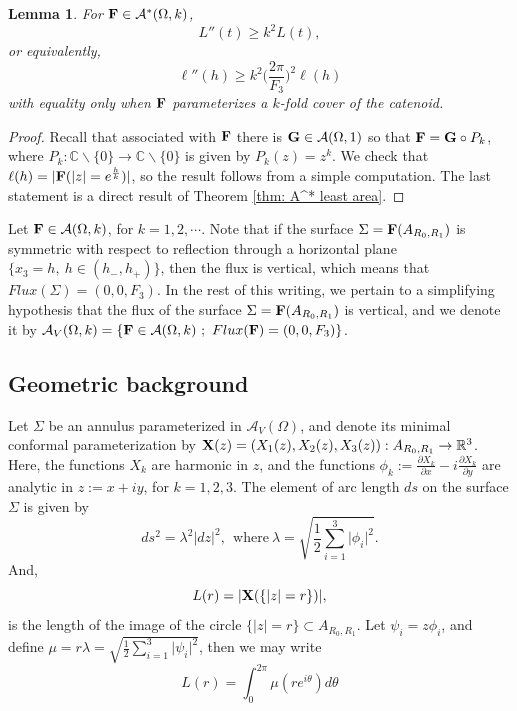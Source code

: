 \documentclass[11pt]{amsart}
\newtheorem{lem}[thm]{Lemma}
\numberwithin{equation}{section}
\theoremstyle{theorem}
\theoremstyle{definition}
\numberwithin{equation}{section}
\begin{document}
\begin{lem} \label{lem: ineq. lenghth for A^*}
    For $\bold{F} \in \mathcal{A}^*(\Omega ,k)$,
    $$
    L''(t)\geq k^2 L(t),
    $$
   or equivalently, 
\begin{equation} 
\nonumber
    \ell ''(h) \geq k^2 \Big ( \frac{2\pi}{F_3} \Big )^2 \ell (h)
\end{equation}
with equality only when $\bold{F}$ parameterizes a $k$-fold cover of the catenoid.
\end{lem}
\begin{proof}
    Recall that associated with $\bold{F}$ there is $\bold{G}\in \mathcal{A}(\Omega,1)$ so that $\bold{F}=\bold{G}\circ P_k$, where $P_k:\mathbb{C}\backslash \{0\} \rightarrow \mathbb{C}\backslash \{0\}$ is given by $P_k(z)=z^k$. We check that $\ell(h)=\vert \bold{F}(\vert z\vert =e^{\frac{h}{k}}) \vert $, so the result follows from a simple computation. The last statement is a direct result of Theorem \ref{thm: A^* least area}.
\end{proof}
\medskip

Let $\bold{F} \in \mathcal{A}(\Omega ,k)$, for $k=1,2, \cdots$. Note that if the surface $\Sigma = \bold{F}(A_{R_0,R_1})$ is symmetric with respect to reflection through a horizontal plane $\{ x_3=h,\ h\in (h_-,h_+)\}$, then the flux is vertical, which means that $Flux(\Sigma)=(0,0,F_3)$. In the rest of this writing, we pertain to a simplifying hypothesis that the flux of the surface $\Sigma = \bold{F}(A_{R_0,R_1})$ is vertical, and we denote it by $\mathcal{A}_V(\Omega,k)=\{ \bold{F} \in \mathcal{A}(\Omega,k)\ ;\ Flux(\bold{F})=(0,0,F_3)\}$.


\subsection{Geometric background}
Let $\Sigma$ be an annulus parameterized in $ \mathcal{A}_V(\Omega)$, and denote its minimal conformal parameterization by $\bold{X}(z)=(X_1(z),X_2(z),X_3(z)) : A_{R_0,R_1} \rightarrow \mathbb{R}^3$. Here, the functions $X_k$ are harmonic in $z$, and the functions $\phi_k := \frac{\partial X_k}{\partial x} - i\frac{\partial X_k}{\partial y}$ are analytic in $z:=x+iy$, for $k=1,2,3$. The element of arc length $ds$ on the surface $\Sigma$ is given by
\begin{equation}
    \nonumber
    ds^2 = \lambda^2 \vert dz\vert^2,\ \ \text{where}\ \lambda = \sqrt{\frac{1}{2}\sum_{i=1}^{3}\vert \phi_i \vert^2}.
\end{equation}
And,
\begin{equation}
    \nonumber
    L(r) =\vert \bold{X}(\{ \vert z\vert =r\})\vert ,
\end{equation}
is the length of the image of the circle $\{ \vert z\vert =r \} \subset A_{R_0,R_1}$. Let $\psi_i = z\phi_i$, and define $\mu =r\lambda = \sqrt{\frac{1}{2}\sum_{i=1}^{3}\vert \psi_i \vert^2}$, then we may write 
$$
L(r)= \int_{0}^{2\pi}\mu (re^{i\theta})d\theta  $$
\end{document}
